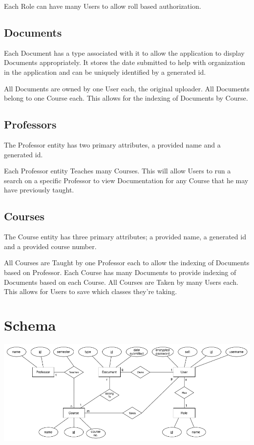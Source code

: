 \documentclass[11pt]{article}
\begin{document}
   Each Role can have many Users to allow roll based authorization.
\subsection*{Documents}
\label{sec-2-3}


   Each Document has a type associated with it to allow the
   application to display Documents appropriately. It stores the date
   submitted to help with organization in the application and can be
   uniquely identified by a generated id.

   All Documents are owned by one User each, the original
   uploader. All Documents belong to one Course each. This allows for
   the indexing of Documents by Course.
\subsection*{Professors}
\label{sec-2-4}


   The Professor entity has two primary attributes, a provided name
   and a generated id. 
   
   Each Professor entity Teaches many Courses. This will allow Users
   to run a search on a specific Professor to view Documentation for
   any Course that he may have previously taught.
\subsection*{Courses}
\label{sec-2-5}


   The Course entity has three primary attributes; a provided name, a
   generated id and a provided course number.  

   All Courses are Taught by one Professor each to allow the indexing of
   Documents based on Professor. Each Course has many Documents to
   provide indexing of Documents based on each Course. All Courses
   are Taken by many Users each. This allows for Users to save which
   classes they're taking.
\section*{Schema}
\label{sec-3}


  \includegraphics[width=.9\linewidth]{ER Diagram.png}
\end{document}
